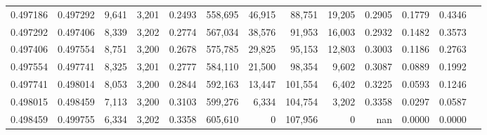 \begin{tabular}{rrrrrrrrrrrrr}
0.497186 & 0.497292 &  9,641 & 3,201 &                                     0.2493 & 558,695 &  46,915 &  88,751 &  19,205 & 0.2905 & 0.1779 & 0.4346 \\
0.497292 & 0.497406 &  8,339 & 3,202 &                                     0.2774 & 567,034 &  38,576 &  91,953 &  16,003 & 0.2932 & 0.1482 & 0.3573 \\
0.497406 & 0.497554 &  8,751 & 3,200 &                                     0.2678 & 575,785 &  29,825 &  95,153 &  12,803 & 0.3003 & 0.1186 & 0.2763 \\
0.497554 & 0.497741 &  8,325 & 3,201 &                                     0.2777 & 584,110 &  21,500 &  98,354 &   9,602 & 0.3087 & 0.0889 & 0.1992 \\
0.497741 & 0.498014 &  8,053 & 3,200 &                                     0.2844 & 592,163 &  13,447 & 101,554 &   6,402 & 0.3225 & 0.0593 & 0.1246 \\
0.498015 & 0.498459 &  7,113 & 3,200 &                                     0.3103 & 599,276 &   6,334 & 104,754 &   3,202 & 0.3358 & 0.0297 & 0.0587 \\
0.498459 & 0.499755 &  6,334 & 3,202 &                                     0.3358 & 605,610 &       0 & 107,956 &       0 &    nan & 0.0000 & 0.0000 \\
\bottomrule
\end{tabular}

